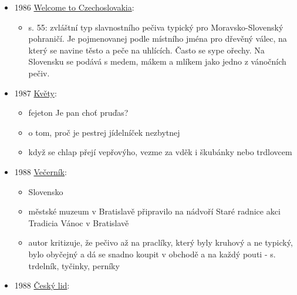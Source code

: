 \begin{itemize}
  \begin{itemize}
  \tightlist
  \item
    číslo 1
  \item
    není online, 
  \item
    měl by tam bejt článek o trdláčích. Ale zdá se, že tištěnou verzi
    mají jen Muzeum J.A.Komenského v Uherském Brodě - Knihovna
  \item
    lokace v knihovně: 1984-90 Bu 929
  \end{itemize}
\item
  1986
  \href{https://www.google.cz/books/edition/Welcome_to_Czechoslovakia/RFbUAAAAMAAJ?hl=en&gbpv=1&bsq=trdeln\%C3\%ADk&dq=trdeln\%C3\%ADk&printsec=frontcover}{Welcome
  to Czechoslovakia}:

  \begin{itemize}
  \tightlist
  \item
    s. 55: zvláštní typ slavnostního pečiva typický pro
    Moravsko-Slovenský pohraničí. Je pojmenovanej podle místního jména
    pro dřevěný válec, na který se navine těsto a peče na uhlících.
    Často se sype ořechy. Na Slovensku se podává s medem, mákem a mlíkem
    jako jedno z vánočních pečiv.
  \end{itemize}
\item
  1987
  \href{https://ceskadigitalniknihovna.cz/uuid/uuid:fb80fd90-a376-11e3-aa54-5ef3fc9bb22f}{Květy}:

  \begin{itemize}
  \tightlist
  \item
    fejeton Je pan choť pruďas?
  \item
    o tom, proč je pestrej jídelníček nezbytnej
  \item
    když se chlap přejí vepřovýho, vezme za vděk i škubánky nebo
    trdlovcem
  \end{itemize}
\item
  1988
  \href{https://dikda.snk.sk/uuid/uuid:f1160e6b-b724-4a15-ba1e-ad92b54d2423}{Večerník}:

  \begin{itemize}
  \tightlist
  \item
    Slovensko
  \item
    městské muzeum v Bratislavě připravilo na nádvoří Staré radnice akci
    Tradicia Vánoc v Bratislavě
  \item
    autor kritizuje, že pečivo až na praclíky, který byly kruhový a ne
    typický, bylo obyčejný a dá se snadno koupit v obchodě a na každý
    pouti - s. trdelník, tyčinky, perníky
  \end{itemize}
\item
  1988
  \href{https://ceskadigitalniknihovna.cz/uuid/uuid:d410e1e0-4611-11e1-1331-001143e3f55c}{Český
  lid}:


\end{itemize}
